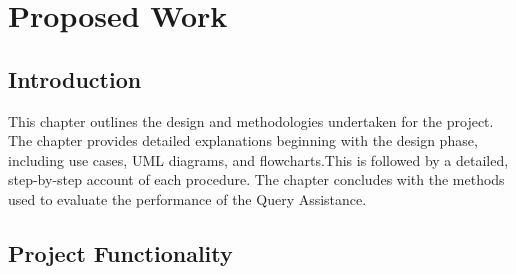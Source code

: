 \chapter{Proposed Work}
\section{Introduction}
This chapter outlines the design and methodologies undertaken for the project. The chapter provides detailed explanations beginning with the design phase, including use cases, UML diagrams, and flowcharts.This is followed by a detailed, step-by-step account of each procedure. The chapter concludes with the methods used to evaluate the performance of the Query Assistance.

\section{Project Functionality}
